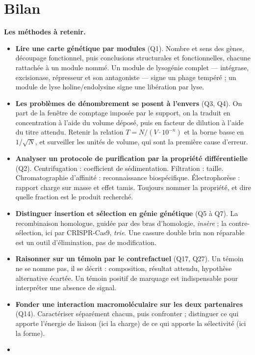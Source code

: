 \documentclass[11pt,a4paper]{article}
\providecommand{\tightlist}{\setlength{\itemsep}{0pt}\setlength{\parskip}{0pt}}
\begin{document}
\hypertarget{bilan}{%
\section{Bilan}\label{bilan}}

\textbf{Les méthodes à retenir.}

\begin{itemize}
\tightlist
\item
  \textbf{Lire une carte génétique par modules} (Q1). Nombre et sens des gènes, découpage fonctionnel, puis conclusions structurales et fonctionnelles, chacune rattachée à un module nommé. Un module de lysogénie complet --- intégrase, excisionase, répresseur et son antagoniste --- signe un phage tempéré ; un module de lyse holine/endolysine signe une libération par lyse.
\item
  \textbf{Les problèmes de dénombrement se posent à l'envers} (Q3, Q4). On part de la fenêtre de comptage imposée par le support, on la traduit en concentration à l'aide du volume déposé, puis en facteur de dilution à l'aide du titre attendu. Retenir la relation \(T = N/(V\cdot 10^{-n})\) et la borne basse en \(1/\sqrt{N}\), et surveiller les unités de volume, qui sont la première cause d'erreur.
\item
  \textbf{Analyser un protocole de purification par la propriété différentielle} (Q2). Centrifugation : coefficient de sédimentation. Filtration : taille. Chromatographie d'affinité : reconnaissance biospécifique. Électrophorèse : rapport charge sur masse et effet tamis. Toujours nommer la propriété, et dire quelle fraction est le produit recherché.
\item
  \textbf{Distinguer insertion et sélection en génie génétique} (Q5 à Q7). La recombinaison homologue, guidée par des bras d'homologie, \emph{insère} ; la contre-sélection, ici par CRISPR-Cas9, \emph{trie}. Une cassure double brin non réparable est un outil d'élimination, pas de modification.
\item
  \textbf{Raisonner sur un témoin par le contrefactuel} (Q17, Q27). Un témoin ne se nomme pas, il se décrit : composition, résultat attendu, hypothèse alternative écartée. Un témoin positif de marquage est indispensable pour interpréter une absence de signal.
\item
  \textbf{Fonder une interaction macromoléculaire sur les deux partenaires} (Q14). Caractériser séparément chacun, puis confronter ; distinguer ce qui apporte l'énergie de liaison (ici la charge) de ce qui apporte la sélectivité (ici la forme).
\item

\end{itemize}
\end{document}
